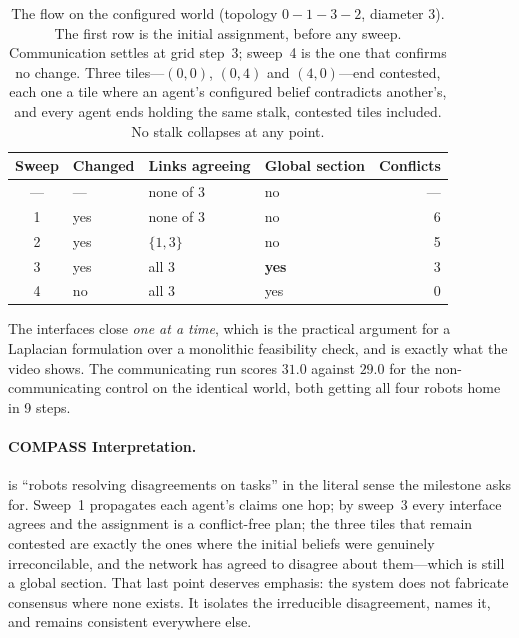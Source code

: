 \documentclass[11pt]{article}
\newif\ifshowcomments
\theoremstyle{definition}
\theoremstyle{remark}
\newcommand{\task}[1]{%
    \ifshowcomments
        ~\todo[inline, color=buzzgold!60, textcolor=black,caption={Task}]{{\bf Task:} #1}%
    \fi
}
\newcommand{\ai}[1]{%
    \ifshowcomments
        \noindent\textcolor{techred}{[AI Agent]: #1}%
    \fi
}
\begin{document}
\begin{table}[h]
\centering
\small
\begin{tabular}{@{}clllr@{}}
\toprule
\textbf{Sweep} & \textbf{Changed} & \textbf{Links agreeing} & \textbf{Global section} & \textbf{Conflicts} \\
\midrule
--- & --- & none of 3 & no  & --- \\
1   & yes & none of 3 & no  & 6 \\
2   & yes & $\{1,3\}$ & no  & 5 \\
3   & yes & all 3     & \textbf{yes} & 3 \\
4   & no  & all 3     & yes & 0 \\
\bottomrule
\end{tabular}
\caption{The flow on the configured world (topology $0-1-3-2$, diameter 3). The first row is
the initial assignment, before any sweep. Communication settles at grid step~3; sweep~4 is the
one that confirms no change. Three tiles---$(0,0)$, $(0,4)$ and $(4,0)$---end contested, each
one a tile where an agent's configured belief contradicts another's, and every agent ends
holding the same stalk, contested tiles included. No stalk collapses at any point.}
\label{tab:traced}
\end{table}

The interfaces close \emph{one at a time}, which is the practical argument for a Laplacian
formulation over a monolithic feasibility check, and is exactly what the video shows.
The communicating run scores $31.0$ against $29.0$ for the non-communicating control on the
identical world, both getting all four robots home in 9 steps.

\paragraph{COMPASS Interpretation.}
 is ``robots resolving disagreements on tasks'' in the literal sense the
milestone asks for.
Sweep~1 propagates each agent's claims one hop; by sweep~3 every interface agrees and the
assignment is a conflict-free plan; the three tiles that remain contested are exactly the ones
where the initial beliefs were genuinely irreconcilable, and the network has agreed to disagree
about them---which is still a global section.
That last point deserves emphasis: the system does not fabricate consensus where none exists.
It isolates the irreducible disagreement, names it, and remains consistent everywhere else.

\task{Insert the figure of the configured world: the grid, the four agents, their
assigned targets, the true hazards, the topology, and the seeded
disagreements marked.}
\ai{Done for the delivered demonstration world as \Cref{fig:world} in \S\ref{sec:subtask51}.}
\end{document}
